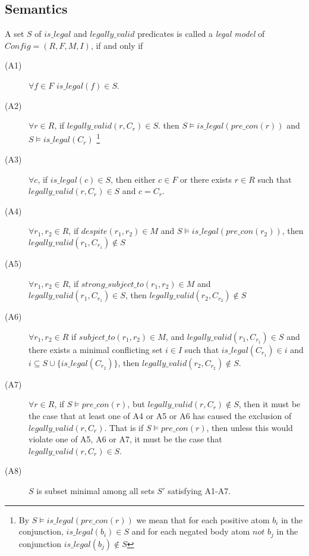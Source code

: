\subsection{Semantics}

A set $S$ of $is\_legal$ and $legally\_valid$ predicates is called a \textit{legal model} of $Config = (R,F,M,I)$, if and only if
\begin{description}
\item[(A1)]$\forall f \in F$ $is\_legal(f) \in S$.\\
\item[(A2)] $\forall r \in R$, if $legally\_valid(r,C_{r}) \in S$. then $S\models is\_legal(pre\_con(r))$ and $S\models is\_legal(C_{r})$ \footnote{By $S\models is\_legal(pre\_con(r))$ we mean that for each positive atom $b_{i}$ in the conjunction, $is\_legal(b_{i}) \in S$ and for each negated body atom $not$ $b_{j}$ in the conjunction $is\_legal(b_{j})\notin S$ }\\ 
\item[(A3)] $\forall c$, if $is\_legal(c) \in S$, then either $c\in F$ or there exists $r \in R$ such that $legally\_valid(r,C_{r}) \in S$ and $c= C_{r}$.\\
\item[(A4)] $\forall r_{1}, r_{2} \in R$, if $despite(r_{1}, r_{2}) \in M$ and $S\models is\_legal(pre\_con(r_{2}))$, then $legally\_valid(r_{1},C_{r_{1}}) \notin S$\\
\item[(A5)] $\forall r_{1}, r_{2} \in R$, if $strong\_subject\_to(r_{1}, r_{2}) \in M$ and $legally\_valid(r_{1},C_{r_{1}}) \in S$, then $legally\_valid(r_{2},C_{r_{2}}) \notin S$\\
\item[(A6)] $\forall r_{1},r_{2} \in R$ if $subject\_to(r_{1},r_{2}) \in M$, and $legally\_valid(r_{1},C_{r_{1}}) \in S$ and there exists a minimal conflicting set $i \in I$ such that $is\_legal(C_{r_{1}}) \in i$ and $i\subseteq S\cup \{is\_legal(C_{r_{2}})\}$, then $legally\_valid(r_{2},C_{r_{2}}) \notin S$.\\
\item[(A7)] $\forall r\in R$, if $S\models pre\_con(r)$, but $legally\_valid(r,C_{r})\notin S$, then it must be the case that at least one of A4 or A5 or A6 has caused the exclusion of $legally\_valid(r,C_{r})$. That is if $S\models pre\_con(r)$, then unless this would violate one of A5, A6 or A7, it must be the case that $legally\_valid(r,C_{r})\in S$.\\
\item[(A8)] $S$ is subset minimal among all sets $S'$ satisfying A1-A7.
\end{description}

